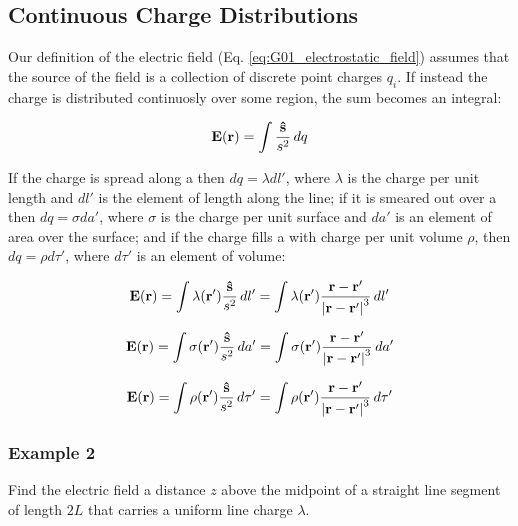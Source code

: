 \subsection{Continuous Charge Distributions}

Our definition of the electric field (Eq. \ref{eq:G01_electrostatic_field}) assumes that the source of the field is a collection of discrete point charges $q_i$. If instead the charge is distributed continuosly over some region, the sum becomes an integral:

\begin{equation}
\label{eq:G01_electrostatic_field_continuous}
\vb{E}(\vb{r}) = \int \frac{\vu{s}}{s^2} \,dq
\end{equation}

If the charge is spread along a  then $dq = \lambda dl'$, where $\lambda$ is the charge per unit length and $dl'$ is the element of length along the line; if it is smeared out over a  then $dq = \sigma da'$, where $\sigma$ is the charge per unit surface and $da'$ is an element of area over the surface; and if the charge fills a  with charge per unit volume $\rho$, then $dq = \rho d\tau'$, where $d\tau'$ is an element of volume:

\begin{equation}
\label{eq:G01_electrostatic_field_continuous_line}
\vb{E}(\vb{r}) = \int \lambda(\vb{r}') \frac{\vu{s}}{s^2} \,dl' =  \int \lambda(\vb{r}') \frac{\vb{r} - \vb{r}'}{\abs{\vb{r} - \vb{r}'}^3} \,dl'
\end{equation}

\begin{equation}
\label{eq:G01_electrostatic_field_continuous_surf}
\vb{E}(\vb{r}) = \int \sigma(\vb{r}') \frac{\vu{s}}{s^2} \,da'  =   \int \sigma(\vb{r}') \frac{\vb{r} - \vb{r}'}{\abs{\vb{r} - \vb{r}'}^3} \,da'
\end{equation}

\begin{equation}
\label{eq:G01_electrostatic_field_continuous_vol}
\vb{E}(\vb{r}) = \int \rho(\vb{r}') \frac{\vu{s}}{s^2} \,d\tau' = \int \rho(\vb{r}') \frac{\vb{r} - \vb{r}'}{\abs{\vb{r} - \vb{r}'}^3} \,d\tau'
\end{equation}
 
\subsubsection*{Example 2}
Find the electric field a distance $z$ above the midpoint of a straight line segment of length $2L$ that carries a uniform line charge  $\lambda$. 

